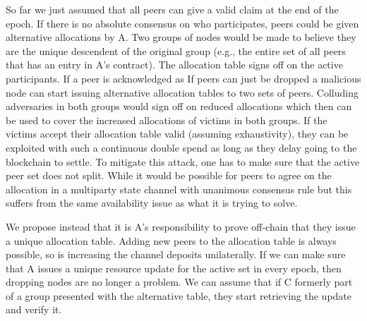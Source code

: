 So far we just assumed that all peers can give a valid claim at the end of the epoch. 
If there is no absolute consensus on who participates, peers could be given alternative allocations by A. Two groups of nodes would be made to believe they are the unique descendent of the original group (e.g., the entire set of all peers that has an entry in A's contract). The allocation table signs off on the active participants.
If a peer is acknowledged as If peers can just be dropped a malicious node can start issuing alternative allocation tables to two sets of peers. Colluding adversaries in both groups would sign off on reduced allocations which then can be used to cover the increased allocations of victims in both groups. If the victims accept their allocation table valid (assuming exhaustivity), they can be exploited with such a continuous double spend as long as they delay going to the blockchain to settle. To mitigate this attack, one has to make sure that the active peer set does not split. While it would be possible for peers to agree on the allocation in a multiparty state channel with unanimous consensus rule but this suffers from the same availability issue as what it is trying to solve.

We propose instead that it is A's responsibility to prove off-chain that they issue a unique allocation table. 
Adding new peers to the allocation table is always possible, so is increasing the channel deposits unilaterally. 
If we can make sure that A issues a unique resource update for the active set in every epoch, then dropping nodes are no longer a problem. 
We can assume that if C formerly part of a group presented with the alternative table, they start retrieving the update and verify it. 

